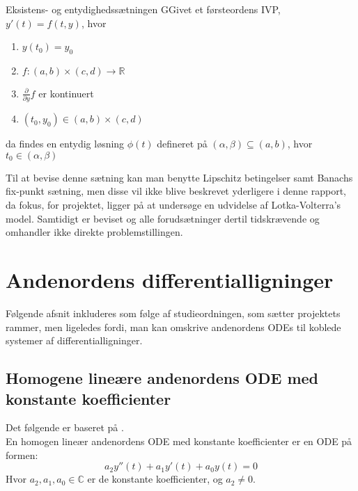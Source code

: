 \begin{mytheo}{Eksistens- og entydighedssætningen}
GGivet et førsteordens IVP, $y'(t)=f(t,y)$, hvor 

\begin{enumerate}
    \item $y(t_0)=y_0$
    \item $f:(a,b) \times (c,d) \rightarrow \mathbb{R}$
    \item $\frac{\partial}{\partial y}f$ er kontinuert
    \item $(t_0,y_0) \in (a,b) \times (c,d)$
\end{enumerate}

da findes en entydig løsning $\phi(t)$ defineret på $(\alpha,\beta)\subseteq (a,b)$, hvor $t_0 \in (\alpha, \beta)$ 
\end{mytheo}

Til at bevise denne sætning kan man benytte Lipschitz betingelser samt Banachs fix-punkt sætning, men disse vil ikke blive beskrevet yderligere i denne rapport, da fokus, for projektet, ligger på at undersøge en udvidelse af Lotka-Volterra's model. Samtidigt er beviset og alle forudsætninger dertil tidskrævende og omhandler ikke direkte problemstillingen. 

\section{Andenordens differentialligninger}
Følgende afsnit inkluderes som følge af studieordningen, som sætter projektets rammer, men ligeledes fordi, man kan omskrive andenordens ODEs til koblede systemer af differentialligninger.
\subsection{Homogene lineære andenordens ODE med konstante koefficienter}
Det følgende er baseret på \citep[s. 221]{JAB}. \\ \hfill \break En homogen lineær andenordens ODE med konstante koefficienter er en ODE på formen: \hfill \break
\begin{equation}
\label{homlinandord}
    a_2y''(t)+a_1y'(t)+a_0y(t)=0
\end{equation} \hfill \break
Hvor $a_2,a_1,a_0\in \mathbb{C}$ er de konstante koefficienter, og $a_2\neq 0$. \hfill \break

